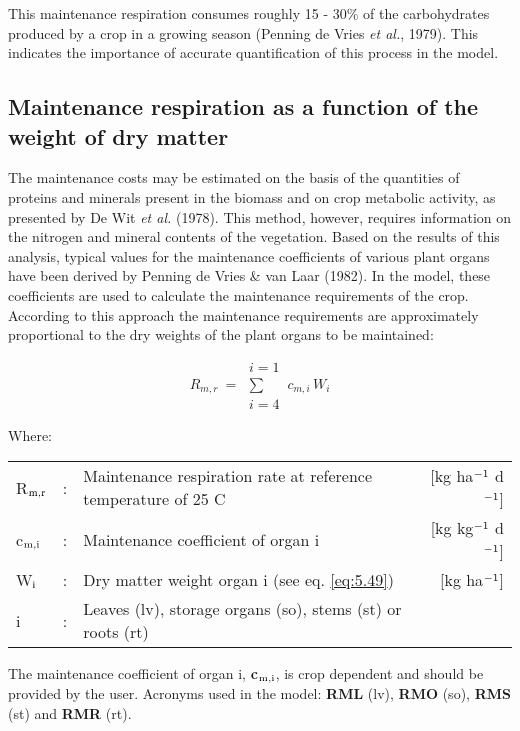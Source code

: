This maintenance respiration consumes roughly 15 - 30\% of the carbohydrates produced
by a crop in a growing season (Penning de Vries {\it et al.}, 1979). This indicates the
importance of accurate quantification of this process in the model.

\subsection{Maintenance respiration as a function of the weight of dry matter}
The maintenance costs may be estimated on the basis of the quantities of proteins and
minerals present in the biomass and on crop metabolic activity, as presented by De Wit {\it et
	al.} (1978). This method, however, requires information on the nitrogen and mineral
contents of the vegetation.
Based on the results of this analysis, typical values for the maintenance coefficients of
various plant organs have been derived by Penning de Vries \& van Laar (1982).
In the model, these coefficients are used to calculate the maintenance requirements of the
crop. According to this approach the maintenance requirements are approximately 
proportional to the dry weights of the plant organs to be maintained: 

\begin{equation}
\label{eq:5.39}
R _{m,r} ~ = ~\begin{array}{c} {i=1}  \\
\sum  \\
{i=4}\end{array} \, c _{m,i} \, W _{i}
\end{equation}

Where:\\[5pt]
\begin{tabularx}{\textwidth}{llXr}
	R$_{{\rm m,r}}$ &:& Maintenance respiration rate at reference 
	temperature of 25 \textdegree C &   [kg ha$^{{\rm -1}}$ d$^{{\rm -1}}$]\\
	c$_{{\rm m,i}}$ &:& Maintenance coefficient of organ i  & [kg kg$^{{\rm -1}}$ d$^{{\rm -1}}$]\\
	W$_{{\rm i}}$ &:& Dry matter weight organ i (see eq. \ref{eq:5.49})   &     [kg ha$^{{\rm -1}}$]\\
	i &:& Leaves (lv), storage organs (so), stems (st) or roots (rt)\\ 
\end{tabularx}

The maintenance coefficient of organ i, {\bf c$_{{\rm m,i}}$}, is crop dependent and should be provided by
the user. Acronyms used in the model: {\bf RML} (lv), {\bf RMO} (so), {\bf RMS} (st) and {\bf RMR} (rt).

